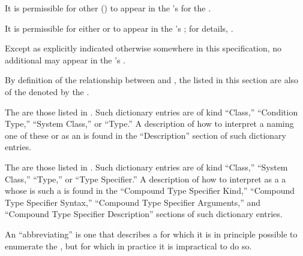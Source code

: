 It is permissible for other () 
to appear in the 's  for the .

It is permissible for 
  either 
      or 
to appear in the 's ;
for details, \seesection\TypeRelationships.

Except as explicitly indicated otherwise somewhere in this specification,
no additional   may appear in 
the 's .

By definition of the relationship between  and ,
the  listed in this section are also  of 
the  denoted by the .

\endsubsubsection%


The  are those  
listed in \figref\StandardizedAtomicTypeSpecs.
Such dictionary entries are of kind 
``Class,'' ``Condition Type,'' ``System Class,'' or ``Type.''
A description of how to interpret 
a  naming one of these  or  
as an 
is found in the ``Description'' section of such dictionary entries.

The  are those  
listed in \figref\StandardizedCompoundTypeSpecNames.
Such dictionary entries are of kind ``Class,'' ``System Class,''
``Type,'' or ``Type Specifier.''
A description of how to interpret as a 
a  whose  is such a 
is found in the 
     ``Compound Type Specifier Kind,''
     ``Compound Type Specifier Syntax,''
     ``Compound Type Specifier Arguments,''
 and ``Compound Type Specifier Description''
sections of such dictionary entries.


An ``abbreviating''  is one that describes a 
for which it is in principle possible to enumerate the ,
but for which in practice it is impractical to do so.

